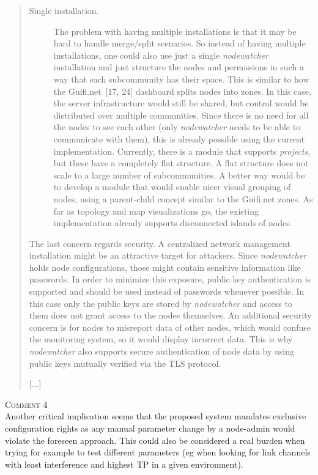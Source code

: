 \documentclass[12pt,twoside,a4paper]{report}
\newcommand{\nodewatcher}{\textit{nodewatcher}}
\begin{document}
\begin{quote}
\begin{description}
    \item[Single installation.] The problem with having multiple installations is that it may be hard to handle merge/split scenarios.
    So instead of having multiple installations, one could also use just a single \nodewatcher{} installation and just structure the nodes and permissions in such a way that each subcommunity has their space.
    This is similar to how the Guifi.net~[17, 24] dashboard splits nodes into zones.
    In this case, the server infrastructure would still be shared, but control would be distributed over multiple communities.
    Since there is no need for all the nodes to see each other (only \nodewatcher{} needs to be able to communicate with them), this is already possible using the current implementation.
    Currently, there is a module that supports \textit{projects}, but these have a completely flat structure.
    A flat structure does not scale to a large number of subcommunities.
    A better way would be to develop a module that would enable nicer visual grouping of nodes, using a parent-child concept similar to the Guifi.net zones.
    As far as topology and map visualizations go, the existing implementation already supports disconnected islands of nodes.
\end{description}

The last concern regards security.
A centralized network management installation might be an attractive target for attackers.
Since \nodewatcher{} holds node configurations, those might contain sensitive information like passwords.
In order to minimize this exposure, public key authentication is supported and should be used instead of passwords whenever possible.
In this case only the public keys are stored by \nodewatcher{} and access to them does not grant access to the nodes themselves.
An additional security concern is for nodes to misreport data of other nodes, which would confuse the monitoring system, so it would display incorrect data.
This is why \nodewatcher{} also supports secure authentication of node data by using public keys mutually verified via the TLS protocol.

[...]

\end{quote}

\vspace{0.5cm}\noindent\textsc{Comment 4}\\
Another critical implication seems that the proposed system mandates exclusive configuration rights as any manual parameter change by a node-admin would violate the foreseen approach. This could also be considered a real burden when trying for example to test different parameters (eg when looking for link channels with least interference and highest TP in a given environment).
\end{document}
